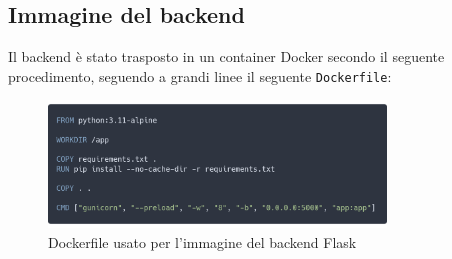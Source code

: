 \subsection{Immagine del backend}
\label{deployment-backend}
Il backend è stato trasposto in un container Docker secondo il seguente procedimento, seguendo a grandi linee il seguente \texttt{Dockerfile}:
\begin{figure}[!h]
    \centering
    \includegraphics[width=0.8\textwidth]{img/dockerfile-backend.png}
    \caption{Dockerfile usato per l'immagine del backend Flask}
\end{figure}
